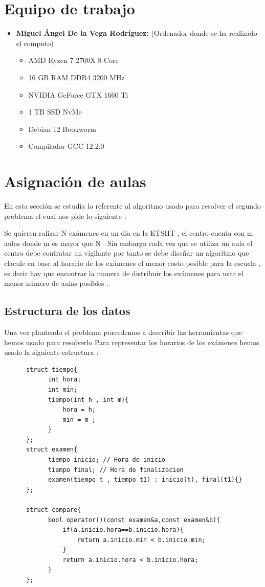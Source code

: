 \documentclass[11pt,openany]{book}
\begin{document}
\chapter{Equipo de trabajo}

\begin{itemize}
      \item \textbf{Miguel Ángel De la Vega Rodríguez:} (Ordenador donde se ha realizado el computo)
            \begin{itemize}
                  \item AMD Ryzen 7 2700X 8-Core
                  \item 16 GB RAM DDR4 3200 MHz
                  \item NVIDIA GeForce GTX 1660 Ti
                  \item 1 TB SSD NvMe
                  \item Debian 12 Bookworm
                  \item Compilador GCC 12.2.0
            \end{itemize}
\end{itemize}

\chapter{Asignación de aulas}
En esta sección se estudia lo referente al algoritmo usado para resolver el segundo 
problema el cual nos pide lo siguiente :

Se quieren ralizar N exámenes en un día en la ETSIIT , el centro cuenta con m aulas donde m es mayor
que N . Sin embargo cada vez que se utiliza un aula el centro debe contratar un vigilante por tanto 
se debe diseñar un algoritmo que clacule en base al horario de los exámenes el menor costo posible 
para la escuela , es decir hay que encontrar la manera de distribuir los exámenes para usar el menor número
de aulas posibles .

\section{Estructura de los datos}
Una vez planteado el problema porcedemos a describir las herramientas que hemos usado para resolverlo 
Para representar los horarios de los exámenes hemos usado la siguiente estructura :

\begin{lstlisting}
      struct tiempo{
            int hora;
            int min;
            tiempo(int h , int m){
                hora = h;
                min = m ;
            }
      };
      struct examen{
            tiempo inicio; // Hora de inicio
            tiempo final; // Hora de finalizacion
            examen(tiempo t , tiempo t1) : inicio(t), final(t1){}
      };
        
      struct compare{
            bool operator()(const examen&a,const examen&b){
                if(a.inicio.hora==b.inicio.hora){
                    return a.inicio.min < b.inicio.min;
                }
                return a.inicio.hora < b.inicio.hora;
            }
      };
        
\end{lstlisting}
\end{document}
